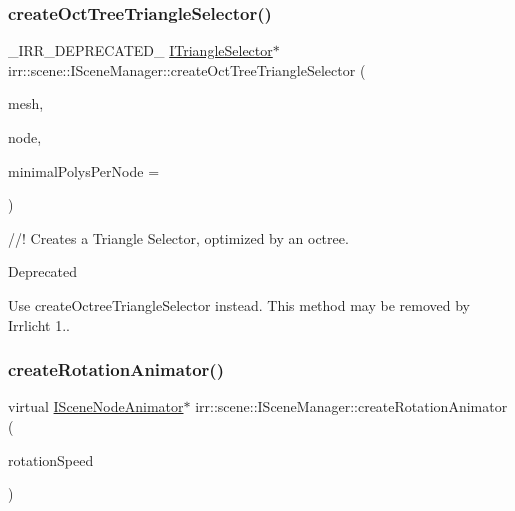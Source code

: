 \subsubsection{\texorpdfstring{create\+Oct\+Tree\+Triangle\+Selector()}{createOctTreeTriangleSelector()}}
{\footnotesize\ttfamily \+\_\+\+I\+R\+R\+\_\+\+D\+E\+P\+R\+E\+C\+A\+T\+E\+D\+\_\+ \hyperlink{classirr_1_1scene_1_1ITriangleSelector}{I\+Triangle\+Selector}$\ast$ irr\+::scene\+::\+I\+Scene\+Manager\+::create\+Oct\+Tree\+Triangle\+Selector (\begin{DoxyParamCaption}\item[{\hyperlink{classirr_1_1scene_1_1IMesh}{I\+Mesh} $\ast$}]{mesh,  }\item[{\hyperlink{classirr_1_1scene_1_1ISceneNode}{I\+Scene\+Node} $\ast$}]{node,  }\item[{\hyperlink{namespaceirr_ac66849b7a6ed16e30ebede579f9b47c6}{s32}}]{minimal\+Polys\+Per\+Node = {} }\end{DoxyParamCaption})\hspace{0.3cm}{\ttfamily [inline]}}



//! Creates a Triangle Selector, optimized by an octree. 

\begin{DoxyRefDesc}{Deprecated}
\item[\hyperlink{deprecated__deprecated000020}{Deprecated}]Use create\+Octree\+Triangle\+Selector instead. This method may be removed by Irrlicht 1.. \end{DoxyRefDesc}
\mbox{\label{classirr_1_1scene_1_1ISceneManager_a29efe9505de4e5dc2218283ef0c2a64d}} 
\subsubsection{\texorpdfstring{create\+Rotation\+Animator()}{createRotationAnimator()}}
{\footnotesize\ttfamily virtual \hyperlink{classirr_1_1scene_1_1ISceneNodeAnimator}{I\+Scene\+Node\+Animator}$\ast$ irr\+::scene\+::\+I\+Scene\+Manager\+::create\+Rotation\+Animator (\begin{DoxyParamCaption}\item[{const \hyperlink{namespaceirr_1_1core_a06f169d08b5c429f5575acb7edbad811}{core\+::vector3df} \&}]{rotation\+Speed }\end{DoxyParamCaption})\hspace{0.3cm}{\ttfamily [pure virtual]}}



